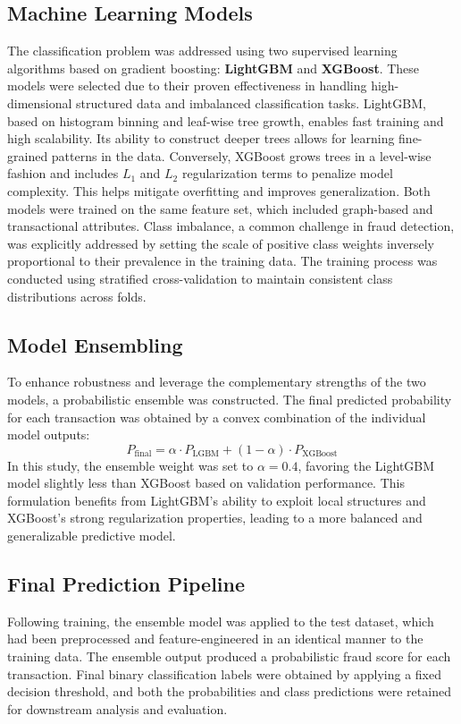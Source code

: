 \documentclass[a4paper]{article}
\begin{document}
\subsection{Machine Learning Models}
The classification problem was addressed using two supervised learning algorithms based on gradient boosting: \textbf{LightGBM} and \textbf{XGBoost}. These models were selected due to their proven effectiveness in handling high-dimensional structured data and imbalanced classification tasks.
LightGBM, based on histogram binning and leaf-wise tree growth, enables fast training and high scalability. Its ability to construct deeper trees allows for learning fine-grained patterns in the data. Conversely, XGBoost grows trees in a level-wise fashion and includes \( L_1 \) and \( L_2 \) regularization terms to penalize model complexity. This helps mitigate overfitting and improves generalization.
Both models were trained on the same feature set, which included graph-based and transactional attributes. Class imbalance, a common challenge in fraud detection, was explicitly addressed by setting the scale of positive class weights inversely proportional to their prevalence in the training data. The training process was conducted using stratified cross-validation to maintain consistent class distributions across folds.
\subsection{Model Ensembling}
To enhance robustness and leverage the complementary strengths of the two models, a probabilistic ensemble was constructed. The final predicted probability for each transaction was obtained by a convex combination of the individual model outputs:
\begin{equation}
P_{\text{final}} = \alpha \cdot P_{\text{LGBM}} + (1 - \alpha) \cdot P_{\text{XGBoost}}
\end{equation}
In this study, the ensemble weight was set to \( \alpha = 0.4 \), favoring the LightGBM model slightly less than XGBoost based on validation performance. This formulation benefits from LightGBM’s ability to exploit local structures and XGBoost’s strong regularization properties, leading to a more balanced and generalizable predictive model.
\subsection{Final Prediction Pipeline}
Following training, the ensemble model was applied to the test dataset, which had been preprocessed and feature-engineered in an identical manner to the training data. The ensemble output produced a probabilistic fraud score for each transaction. Final binary classification labels were obtained by applying a fixed decision threshold, and both the probabilities and class predictions were retained for downstream analysis and evaluation.
\end{document}

